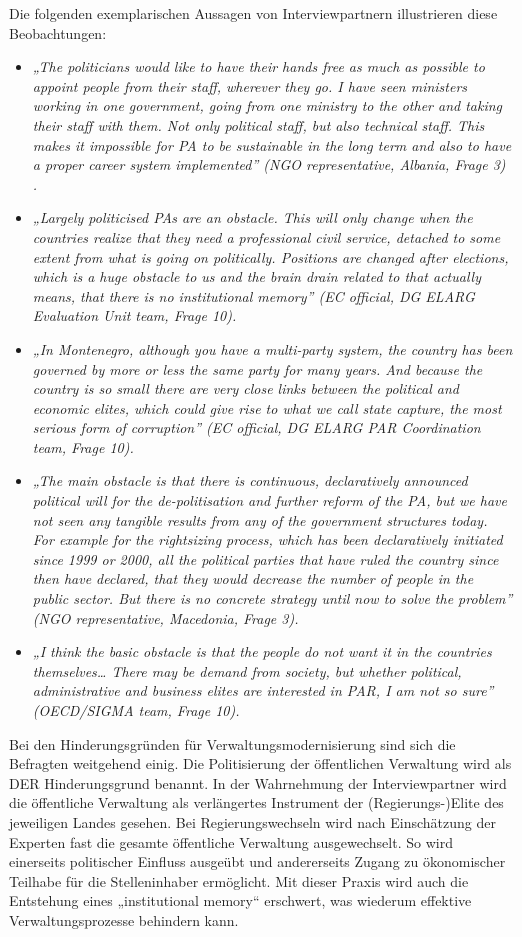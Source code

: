 Die folgenden exemplarischen Aussagen von Interviewpartnern illustrieren diese Beobachtungen:
\begin{itemize}[label={}]
\item \textit{„The politicians would like to have their hands free as much as possible to appoint people from their staff, wherever they go. I have seen ministers working in one government, going from one ministry to the other and taking their staff with them. Not only political staff, but also technical staff. This makes it impossible for PA to be sustainable in the long term and also to have a proper career system implemented” (NGO representative, Albania, Frage 3) .}
\item \textit{„Largely politicised PAs are an obstacle. This will only change when the countries realize that they need a professional civil service, detached to some extent from what is going on politically. Positions are changed after elections, which is a huge obstacle to us and the brain drain related to that actually means, that there is no institutional memory” (EC official, DG ELARG Evaluation Unit team, Frage 10). }
\item \textit{„In Montenegro, although you have a multi-party system, the country has been governed by more or less the same party for many years. And because the country is so small there are very close links between the political and economic elites, which could give rise to what we call state capture, the most serious form of corruption” (EC official, DG ELARG PAR Coordination team, Frage 10).}
\item \textit{„The main obstacle is that there is continuous, declaratively announced political will for the de-politisation and further reform of the PA, but we have not seen any tangible results from any of the government structures today. For example for the rightsizing process, which has been declaratively initiated since 1999 or 2000, all the political parties that have ruled the country since then have declared, that they would decrease the number of people in the public sector. But there is no concrete strategy until now to solve the problem” (NGO representative, Macedonia, Frage 3). }
\item \textit{„I think the basic obstacle is that the people do not want it in the countries themselves… There may be demand from society, but whether political, administrative and business elites are interested in PAR, I am not so sure” (OECD/SIGMA team, Frage 10). }
\end{itemize}
Bei den Hinderungsgründen für Verwaltungsmodernisierung sind sich die Befragten weitgehend einig. Die Politisierung der öffentlichen Verwaltung wird als DER Hinderungsgrund benannt. In der Wahrnehmung der Interviewpartner wird die öffentliche Verwaltung als verlängertes Instrument der (Regierungs-)Elite des jeweiligen Landes gesehen. Bei Regierungswechseln wird nach Einschätzung der Experten fast die gesamte öffentliche Verwaltung ausgewechselt. So wird einerseits politischer Einfluss ausgeübt und andererseits Zugang zu ökonomischer Teilhabe für die Stelleninhaber ermöglicht. Mit dieser Praxis wird auch die Entstehung eines „institutional memory“ erschwert, was wiederum effektive Verwaltungsprozesse behindern kann.
